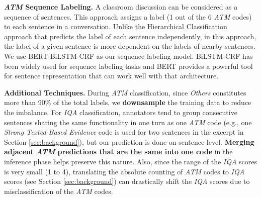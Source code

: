\documentclass[runningheads]{llncs}
\begin{document}
\textbf{\textit{ATM} Sequence Labeling.}
A classroom discussion can be considered as a sequence of sentences. This approach assigns a label (1 out of the 6 \textit{ATM} codes) to each sentence in a conversation. Unlike the Hierarchical Classification approach that predicts the label of each sentence independently, in this approach, the label of a given sentence is more dependent on the labels of nearby sentences. We use BERT-BiLSTM-CRF as our sequence labeling model. BiLSTM-CRF has been widely used for sequence labeling tasks \cite{lstm_crf_2} %
and BERT \cite{bert} provides a powerful tool for sentence representation that can work well with that architecture.

\textbf{Additional Techniques.}
During \textit{ATM} classification, since \textit{Others} constitutes more than 90\% of the total labels, we {\bf downsample} the training data to reduce the imbalance.
For \textit{IQA}  classification, annotators tend to group consecutive sentences sharing the same functionality in one turn as one \textit{ATM} code (e.g., one \textit{Strong Texted-Based Evidence} code is used for two sentences in the excerpt in Section \ref{sec:background}), but our prediction is done on sentence level. 
{\bf Merging adjacent \textit{ATM} predictions that are the same into one code} in the inference phase helps preserve this nature.
Also, since the range of the \textit{IQA}  scores is very small (1 to 4), translating the absolute counting of \textit{ATM} codes to \textit{IQA} scores (see Section \ref{sec:background}) can drastically shift the \textit{IQA} scores due to misclassification of the \textit{ATM} codes.
\end{document}
